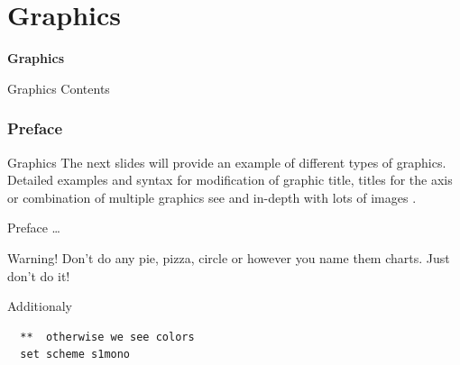 

\part{Graphics}
\begin{frame}
\thispagestyle{empty}
\textbf{\huge{Graphics}}
\end{frame}

\begin{frame}{Graphics Contents}
 \tableofcontents
\end{frame}


\section{Preface}
\begin{frame}{Graphics}
 The next slides will provide an example of different types of graphics. Detailed examples and syntax for modification of graphic title, titles for the axis or combination of multiple graphics see \textcite[Chap. 6]{Kohler2012} and in-depth with lots of images \textcite{Mitchell2012}.
\end{frame}

\begin{frame}[fragile]{Preface \dots}
\begin{alertblock}{Warning!}
Don't do any pie, pizza, circle or however you name them charts. Just don't do it!
\end{alertblock}
\end{frame}

\begin{frame}[fragile]{Additionaly}  
  \begin{lstlisting}
  **  otherwise we see colors
  set scheme s1mono
 \end{lstlisting}
\end{frame}

